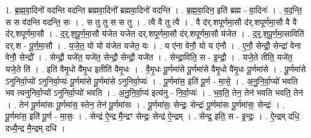 \documentclass[17pt]{extarticle}
\begin{document}
1. ब्र॒ह्म॒वा॒दिनो॑ वदन्ति वदन्ति ब्रह्मवा॒दिनो᳚ ब्रह्मवा॒दिनो॑ वदन्ति । . ब्र॒ह्म॒वा॒दिन॒ इति॑ ब्रह्म - वा॒दिनः॑ । . व॒द॒न्ति॒ स स व॑दन्ति वदन्ति॒ सः । . स तु तु स स तु । . त्वै वै तु त्वै । . वै द॑र्.शपूर्णमा॒सौ द॑र्.शपूर्णमा॒सौ वै वै द॑र्.शपूर्णमा॒सौ । . द॒र्॒.श॒पू॒र्ण॒मा॒सौ य॑जेत यजेत दर्.शपूर्णमा॒सौ द॑र्.शपूर्णमा॒सौ य॑जेत । . द॒र्॒.श॒पू॒र्ण॒मा॒साविति॑ दर्.श - पू॒र्ण॒मा॒सौ । . य॒जे॒त॒ यो यो य॑जेत यजेत॒ यः । . य ए॑ना वेनौ॒ यो य ए॑नौ । . ए॒नौ॒ सेन्द्रौ॒ सेन्द्रा॑ वेना वेनौ॒ सेन्द्रौ᳚ । . सेन्द्रौ॒ यजे॑त॒ यजे॑त॒ सेन्द्रौ॒ सेन्द्रौ॒ यजे॑त । . सेन्द्रा॒विति॒ स - इ॒न्द्रौ॒ । . यजे॒ते तीति॒ यजे॑त॒ यजे॒ते ति॑ । . इति॑ वैमृ॒धो वै॑मृ॒ध इतीति॑ वैमृ॒धः । . वै॒मृ॒धः पू॒र्णमा॑से पू॒र्णमा॑से वैमृ॒धो वै॑मृ॒धः पू॒र्णमा॑से । . पू॒र्णमा॑से ऽनुनिर्वा॒प्यो॑ ऽनुनिर्वा॒प्यः॑ पू॒र्णमा॑से पू॒र्णमा॑से ऽनुनिर्वा॒प्यः॑ । . पू॒र्णमा॑स॒ इति॑ पू॒र्ण - मा॒से॒ । . अ॒नु॒नि॒र्वा॒प्यो॑ भवति भव त्यनुनिर्वा॒प्यो॑ ऽनुनिर्वा॒प्यो॑ भवति । . अ॒नु॒नि॒र्वा॒प्य॑ इत्य॑नु - नि॒र्वा॒प्यः॑ । . भ॒व॒ति॒ तेन॒ तेन॑ भवति भवति॒ तेन॑ । . तेन॑ पू॒र्णमा॑सः पू॒र्णमा॑स॒ स्तेन॒ तेन॑ पू॒र्णमा॑सः । . पू॒र्णमा॑सः॒ सेन्द्रः॒ सेन्द्रः॑ पू॒र्णमा॑सः पू॒र्णमा॑सः॒ सेन्द्रः॑ । . पू॒र्णमा॑स॒ इति॑ पू॒र्ण - मा॒सः॒ । . सेन्द्र॑ ऐ॒न्द्र मै॒न्द्रꣳ सेन्द्रः॒ सेन्द्र॑ ऐ॒न्द्रम् । . सेन्द्र॒ इति॒ स - इ॒न्द्रः॒ । . ऐ॒न्द्रम् दधि॒ दध्यै॒न्द्र मै॒न्द्रम् दधि॑ । \newline
\end{document}
